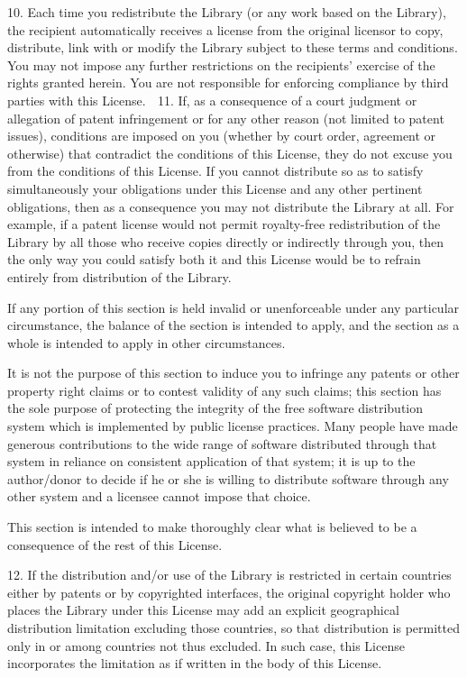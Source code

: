 \documentclass[a4paper,twoside,12pt]{book}
\begin{document}
  10. Each time you redistribute the Library (or any work based on the
Library), the recipient automatically receives a license from the
original licensor to copy, distribute, link with or modify the Library
subject to these terms and conditions.  You may not impose any further
restrictions on the recipients' exercise of the rights granted herein.
You are not responsible for enforcing compliance by third parties with
this License.

  11. If, as a consequence of a court judgment or allegation of patent
infringement or for any other reason (not limited to patent issues),
conditions are imposed on you (whether by court order, agreement or
otherwise) that contradict the conditions of this License, they do not
excuse you from the conditions of this License.  If you cannot
distribute so as to satisfy simultaneously your obligations under this
License and any other pertinent obligations, then as a consequence you
may not distribute the Library at all.  For example, if a patent
license would not permit royalty-free redistribution of the Library by
all those who receive copies directly or indirectly through you, then
the only way you could satisfy both it and this License would be to
refrain entirely from distribution of the Library.

If any portion of this section is held invalid or unenforceable under any
particular circumstance, the balance of the section is intended to apply,
and the section as a whole is intended to apply in other circumstances.

It is not the purpose of this section to induce you to infringe any
patents or other property right claims or to contest validity of any
such claims; this section has the sole purpose of protecting the
integrity of the free software distribution system which is
implemented by public license practices.  Many people have made
generous contributions to the wide range of software distributed
through that system in reliance on consistent application of that
system; it is up to the author/donor to decide if he or she is willing
to distribute software through any other system and a licensee cannot
impose that choice.

This section is intended to make thoroughly clear what is believed to
be a consequence of the rest of this License.

  12. If the distribution and/or use of the Library is restricted in
certain countries either by patents or by copyrighted interfaces, the
original copyright holder who places the Library under this License may add
an explicit geographical distribution limitation excluding those countries,
so that distribution is permitted only in or among countries not thus
excluded.  In such case, this License incorporates the limitation as if
written in the body of this License.
\end{document}
